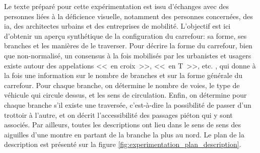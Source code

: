 Le texte préparé pour cette expérimentation est issu d'échanges avec des personnes liées à la déficience visuelle, notamment des personnes concernées, des \gls{ia}, des architectes urbains et des entreprises de mobilité. L'objectif est ici d'obtenir un aperçu synthétique de la configuration du carrefour: sa forme, ses branches et les manières de le traverser. Pour décrire la forme du carrefour, bien que non-normalisé, un consensus à la fois mobilisés par les urbanistes et usagers existe autour des appelations <<~en croix~>>, <<~en T~>>, etc. \citep{fogliaroni2018}, qui donne à la fois une information sur le nombre de branches et sur la forme générale du carrefour. Pour chaque branche, on détermine le nombre de voies, le type de véhicule qui circule dessus, et les sens de circulation. Enfin, on détermine pour chaque branche s'il existe une traversée, c'est-à-dire la possibilité de passer d'un trottoir à l'autre, et on décrit l'accessibilité des passages piéton qui y sont associés. Par ailleurs, toutes les descriptions ont lieu dans le sens de sens des aiguilles d'une montre en partant de la branche la plus au nord. Le plan de la description est présenté sur la figure \ref{fig:experimentation_plan_description}.

